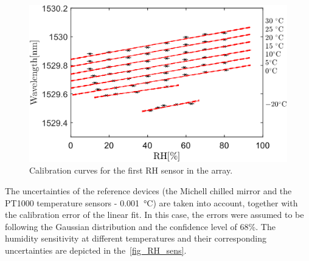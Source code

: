 \begin{figure}[!h]
\centering
\includegraphics[width=0.8\columnwidth]{Chapter5/images/RH1.png}
\caption{Calibration curves for the first \gls{RH} sensor in the array.}
\label{fig_array_calibration}
\end{figure}
\newpage
The uncertainties of the reference devices (the Michell chilled mirror and the PT1000 temperature sensors - \SI{0.001}{\celsius}) are taken into account, together with the calibration error of the linear fit. In this case, the errors were assumed to be following the Gaussian distribution and the confidence level of 68\%. The humidity sensitivity at different temperatures and their corresponding uncertainties are depicted in the~\ref{fig_RH_sens}. 

